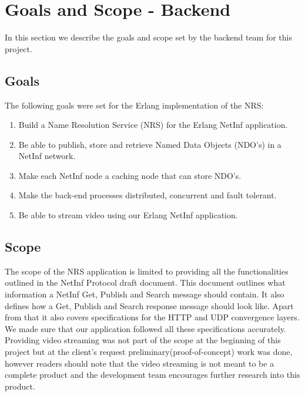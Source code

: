 \section{Goals and Scope - Backend}
In this section we describe the goals and scope set by the backend team for this project.

\subsection{Goals}
The following goals were set for the Erlang implementation of the NRS:
\begin{enumerate}
 \item {Build a Name Resolution Service (NRS) for the Erlang NetInf application.}\\
 \item {Be able to publish, store and retrieve Named Data Objects (NDO's) in a NetInf network.}\\
 \item {Make each NetInf node a caching node that can store NDO's.}\\
 \item {Make the back-end processes distributed, concurrent and fault tolerant.}\\ 
 \item {Be able to stream video using our Erlang NetInf application.}\\
  \end{enumerate}

\subsection{Scope}
The scope of the NRS application is limited to providing all the functionalities outlined in the NetInf Protocol draft document. \cite{netinfproto} This document outlines what information a NetInf Get, Publish and Search message should contain. It also defines how a Get, Publish and Search response message should look like. Apart from that it also covers specifications for the HTTP and UDP convergence layers. We made sure that our application followed all these specifications accurately. Providing video streaming was not part of the scope at the beginning of this project but at the client's request preliminary(proof-of-concept) work was done, however readers should note that the video streaming is not meant to be a complete product and the development team encourages further research into this product.

